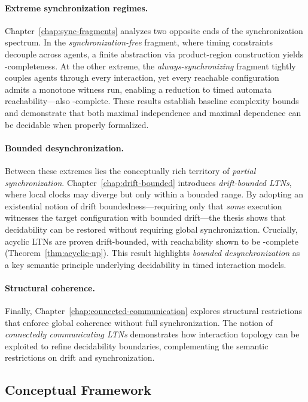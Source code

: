 \paragraph{Extreme synchronization regimes.} Chapter~\ref{chap:sync-fragments} analyzes two opposite ends of the synchronization spectrum. In the \emph{synchronization-free} fragment, where timing constraints decouple across agents, a finite abstraction via product-region construction yields \PSPACE-completeness. At the other extreme, the \emph{always-synchronizing} fragment tightly couples agents through every interaction, yet every reachable configuration admits a monotone witness run, enabling a reduction to timed automata reachability—also \PSPACE-complete. These results establish baseline complexity bounds and demonstrate that both maximal independence and maximal dependence can be decidable when properly formalized.

\paragraph{Bounded desynchronization.} Between these extremes lies the conceptually rich territory of \emph{partial synchronization}. Chapter~\ref{chap:drift-bounded} introduces \emph{drift-bounded LTNs}, where local clocks may diverge but only within a bounded range. By adopting an existential notion of drift boundedness—requiring only that \emph{some} execution witnesses the target configuration with bounded drift—the thesis shows that decidability can be restored without requiring global synchronization. Crucially, acyclic LTNs are proven drift-bounded, with reachability shown to be \NP-complete (Theorem~\ref{thm:acyclic-np}). This result highlights \emph{bounded desynchronization} as a key semantic principle underlying decidability in timed interaction models.

\paragraph{Structural coherence.} Finally, Chapter~\ref{chap:connected-communication} explores structural restrictions that enforce global coherence without full synchronization. The notion of \emph{connectedly communicating LTNs} demonstrates how interaction topology can be exploited to refine decidability boundaries, complementing the semantic restrictions on drift and synchronization.

\subsection*{Conceptual Framework}

